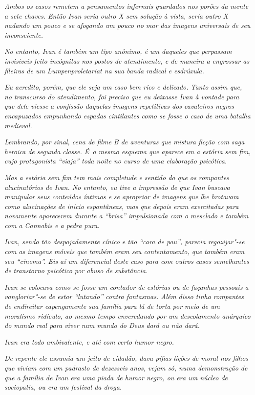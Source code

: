 \emph{Ambos os casos remetem a pensamentos infernais guardados nos
porões da mente a sete chaves. Então Ivan seria outro X sem solução à
vista, seria outro X nadando um pouco e se afogando um pouco no mar das
imagens universais de seu inconsciente.}~

\emph{No entanto, Ivan é também um tipo anônimo, é um daqueles que
perpassam invisíveis feito incógnitas nos postos de atendimento, e de
maneira a engrossar as fileiras de um Lumpenproletariat na sua banda
radical e esdrúxula.}~

\emph{Eu acredito, porém, que ele seja um caso bem rico e delicado.
Tanto assim que, no transcurso do atendimento, foi preciso que eu
deixasse Ivan à vontade para que dele viesse a confissão daquelas
imagens repetitivas dos cavaleiros negros encapuzados empunhando espadas
cintilantes como se fosse o caso de uma batalha medieval.}~

\emph{Lembrando, por sinal, cena de filme B de aventuras que mistura
ficção com saga heroica de segunda classe. É~o mesmo esquema que aparece
em a estória sem fim, cujo protagonista ``viaja'' toda noite no curso de
uma elaboração psicótica.}~

\emph{Mas a estória sem fim tem mais completude e sentido do que os
rompantes alucinatórios de Ivan. No entanto, eu tive a impressão de que
Ivan buscava manipular seus conteúdos íntimos e se apropriar de imagens
que lhe brotavam como alucinações de início espontâneas, mas que depois
eram exercitadas para novamente aparecerem durante a ``brisa''
impulsionada com o mesclado e também com a Cannabis e a pedra pura.}~

\emph{Ivan, sendo tão despojadamente cínico e tão ``cara de pau'',
parecia regozijar"-se com as imagens móveis que também eram seu
contentamento, que também eram seu ``cinema''. Eis aí um diferencial
deste caso para com outros casos semelhantes de transtorno psicótico por
abuso de substância.}~

\emph{Ivan se colocava como se fosse um contador de estórias ou de
façanhas pessoais a vangloriar"-se de estar ``lutando'' contra fantasmas.
Além disso tinha rompantes de endireitar capengamente sua família para
lá de torta por meio de um moralismo ridículo, ao mesmo tempo
enveredando por um descolamento anárquico do mundo real para viver num
mundo do Deus dará ou não dará.}~

\emph{Ivan era todo ambivalente, e até com certo humor negro.}~

\emph{De repente ele assumia um jeito de cidadão, dava pífias lições de
moral nos filhos que viviam com um padrasto de dezesseis anos, vejam só,
numa demonstração de que a família de Ivan era uma piada de humor negro,
ou era um núcleo de sociopatia, ou era um festival da droga.}~

